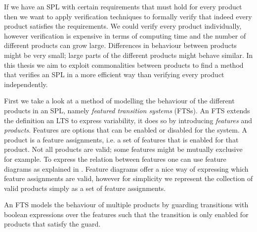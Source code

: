 If we have an SPL with certain requirements that must hold for every product then we want to apply verification techniques to formally verify that indeed every product satisfies the requirements. We could verify every product individually, however verification is expensive in terms of computing time and the number of different products can grow large. Differences in behaviour between products might be very small; large parts of the different products might behave similar. In this thesis we aim to exploit commonalities between products to find a method that verifies an SPL in a more efficient way than verifying every product independently.

First we take a look at a method of modelling the behaviour of the different products in an SPL, namely \textit{featured transition systems} (FTSs). An FTS extends the definition an LTS to express variability, it does so by introducing \textit{features} and \textit{products}. Features are options that can be enabled or disabled for the system. A product is a feature assignments, i.e. a set of features that is enabled for that product. Not all products are valid; some features might be mutually exclusive for example. To express the relation between features one can use feature diagrams as explained in \cite{Classen2013FeaturedTS}. Feature diagrams offer a nice way of expressing which feature assignments are valid, however for simplicity we represent the collection of valid products simply as a set of feature assignments. 

An FTS models the behaviour of multiple products by guarding transitions with boolean expressions over the features such that the transition is only enabled for products that satisfy the guard.

